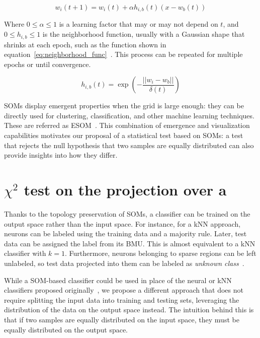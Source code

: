 \begin{equation}
    w_i(t + 1) = w_i(t) + \alpha h_{i,b}(t) (x - w_b(t))
\end{equation}

Where $0 \le \alpha \le 1$ is a learning factor that may or may not depend on $t$,
and $0 \le h_{i,b} \le 1$ is the neighborhood function, usually with a Gaussian shape
that shrinks at each epoch, such as the function shown in equation~\ref{eq:neighborhood_func}~\cite{Villmann1999,wittek_somoclu_2017}.
This process can be repeated for multiple epochs or until convergence.

\begin{equation}
    h_{i,b}(t) = \exp(- \frac{||w_i - w_b||}{\delta(t)})
    \label{eq:neighborhood_func}
\end{equation}


\glspl{SOM} display emergent properties
when the grid is large enough: they can be directly used for clustering,
classification, and other machine learning techniques. These are referred as
\gls{ESOM}~\cite{ultsch2005esom}. This combination of emergence and
visualization capabilities motivates our proposal of a statistical test based
on \glspl{SOM}: a test that rejects the null hypothesis that two samples are equally distributed can also provide insights into how they differ.

\section{\texorpdfstring{$\chi^2$}{χ²} test on the projection over a }
\label{sec:som_chi2}

Thanks to the topology preservation of \glspl{SOM}, a classifier can be trained
on the output space rather than the input space. For instance, for a \gls{kNN}
approach, neurons can be labeled using the training data and a majority rule. Later, test data
can be assigned the label from its \gls{BMU}. This is almost equivalent to a \gls{kNN} classifier with $k=1$.
Furthermore, neurons belonging to sparse regions can be left unlabeled, so test data projected
into them can be labeled as \emph{unknown class}~\cite{ultsch2005esom,silva2011som}.

While a \gls{SOM}-based classifier could be used in place of the neural or \gls{kNN} classifiers proposed
originally~\cite{lopez2016revisiting}, we propose a different approach that does not require
splitting the input data into training and testing sets, leveraging the distribution of the
data on the output space instead. The intuition behind this is that if two samples are equally
distributed on the input space, they must be equally distributed on the output space.


